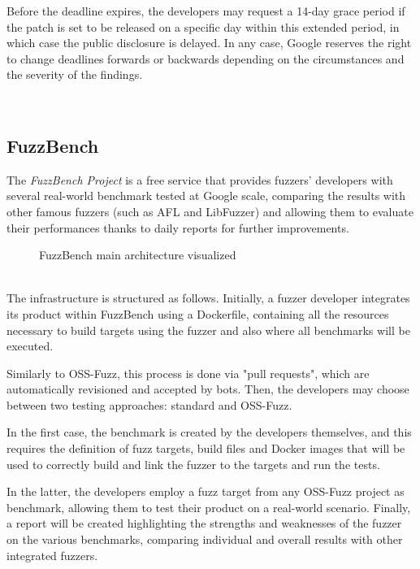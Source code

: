 Before the deadline expires, the developers may request a 14-day grace period if the patch is set to be released on a specific day within this extended period, in which case the public disclosure is delayed.
In any case, Google reserves the right to change deadlines forwards or backwards depending on the circumstances and the severity of the findings.

\ \\
\subsection{FuzzBench}
The \textit{FuzzBench Project} \cite{fuzzbench_paper} is a free service that provides fuzzers' developers with several real-world benchmark tested at Google scale, comparing the results with other famous fuzzers (such as AFL and LibFuzzer) and allowing them to evaluate their performances thanks to daily reports for further improvements.
\cite{fuzzbench_docs}

\begin{figure}[h]
\caption{FuzzBench main architecture visualized \cite{fuzzbench_docs}}
\label{fig:fuzzbench_architecture}
\end{figure}
\ \\
The infrastructure is structured as follows.
Initially, a fuzzer developer integrates its product within FuzzBench using a Dockerfile, containing all the resources necessary to build targets using the fuzzer and also where all benchmarks will be executed.

Similarly to OSS-Fuzz, this process is done via "pull requests", which are automatically revisioned and accepted by bots.
Then, the developers may choose between two testing approaches: standard and OSS-Fuzz.

In the first case, the benchmark is created by the developers themselves, and this requires the definition of fuzz targets, build files and Docker images that will be used to correctly build and link the fuzzer to the targets and run the tests.

In the latter, the developers employ a fuzz target from any OSS-Fuzz project as benchmark, allowing them to test their product on a real-world scenario.
Finally, a report will be created highlighting the strengths and weaknesses of the fuzzer on the various benchmarks, comparing individual and overall results with other integrated fuzzers.